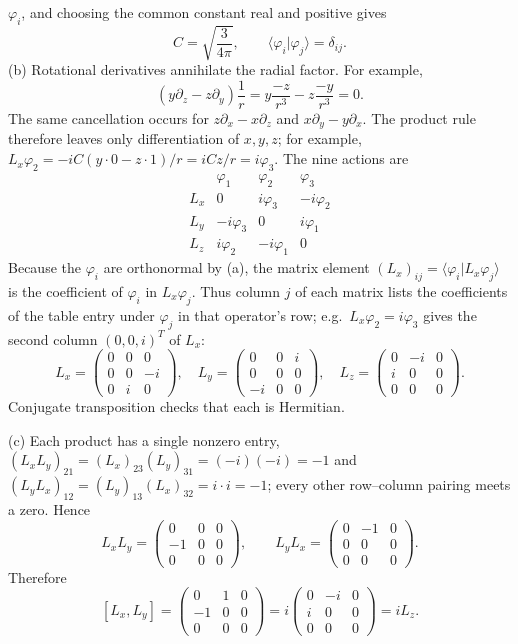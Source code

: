$\varphi_i$, and choosing the common constant real and positive gives
\[
\boxed{C=\sqrt{\frac3{4\pi}}},\qquad
\langle\varphi_i|\varphi_j\rangle=\delta_{ij}.
\]
(b) Rotational derivatives annihilate the radial factor. For example,
\[
\left(y\partial_z-z\partial_y\right)\frac1r
=y\frac{-z}{r^3}-z\frac{-y}{r^3}=0.
\]
The same cancellation occurs for $z\partial_x-x\partial_z$ and
$x\partial_y-y\partial_x$. The product rule therefore leaves only
differentiation of $x,y,z$; for example,
$L_x\varphi_2=-iC(y\cdot0-z\cdot1)/r=iCz/r=i\varphi_3$.
The nine actions are
\[
\begin{array}{c|ccc}
 &\varphi_1&\varphi_2&\varphi_3\\\hline
L_x&0&i\varphi_3&-i\varphi_2\\
L_y&-i\varphi_3&0&i\varphi_1\\
L_z&i\varphi_2&-i\varphi_1&0
\end{array}
\]
Because the $\varphi_i$ are orthonormal by (a), the matrix element
$(L_x)_{ij}=\langle\varphi_i|L_x\varphi_j\rangle$ is the coefficient
of $\varphi_i$ in $L_x\varphi_j$. Thus column $j$ of each matrix lists
the coefficients of the table entry under $\varphi_j$ in that
operator's row; e.g.\ $L_x\varphi_2=i\varphi_3$ gives the second
column $(0,0,i)^T$ of $L_x$:
\[
\boxed{L_x=\begin{pmatrix}0&0&0\\0&0&-i\\0&i&0\end{pmatrix},\quad
L_y=\begin{pmatrix}0&0&i\\0&0&0\\-i&0&0\end{pmatrix},\quad
L_z=\begin{pmatrix}0&-i&0\\i&0&0\\0&0&0\end{pmatrix}.}
\]
Conjugate transposition checks that each is Hermitian.

(c) Each product has a single nonzero entry,
$(L_xL_y)_{21}=(L_x)_{23}(L_y)_{31}=(-i)(-i)=-1$ and
$(L_yL_x)_{12}=(L_y)_{13}(L_x)_{32}=i\cdot i=-1$; every other
row--column pairing meets a zero. Hence
\[
L_xL_y=\begin{pmatrix}0&0&0\\-1&0&0\\0&0&0\end{pmatrix},\qquad
L_yL_x=\begin{pmatrix}0&-1&0\\0&0&0\\0&0&0\end{pmatrix}.
\]
Therefore
\[
[L_x,L_y]=\begin{pmatrix}0&1&0\\-1&0&0\\0&0&0\end{pmatrix}
=i\begin{pmatrix}0&-i&0\\i&0&0\\0&0&0\end{pmatrix}=\boxed{iL_z}.
\]

